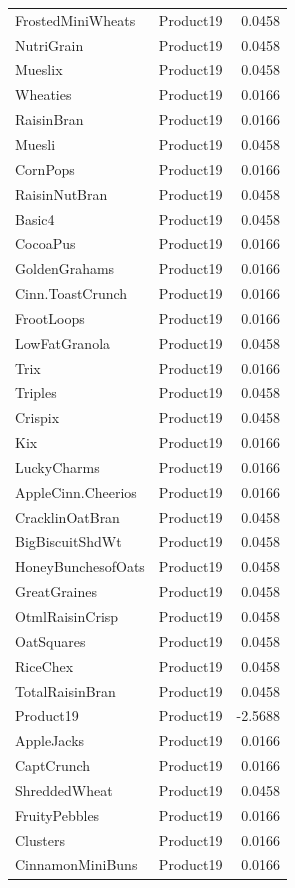 \begin{longtable}{llr}
FrostedMiniWheats & Product19 & 0.0458 \\
NutriGrain & Product19 & 0.0458 \\
Mueslix & Product19 & 0.0458 \\
Wheaties & Product19 & 0.0166 \\
RaisinBran & Product19 & 0.0166 \\
Muesli & Product19 & 0.0458 \\
CornPops & Product19 & 0.0166 \\
RaisinNutBran & Product19 & 0.0458 \\
Basic4 & Product19 & 0.0458 \\
CocoaPus & Product19 & 0.0166 \\
GoldenGrahams & Product19 & 0.0166 \\
Cinn.ToastCrunch & Product19 & 0.0166 \\
FrootLoops & Product19 & 0.0166 \\
LowFatGranola & Product19 & 0.0458 \\
Trix & Product19 & 0.0166 \\
Triples & Product19 & 0.0458 \\
Crispix & Product19 & 0.0458 \\
Kix & Product19 & 0.0166 \\
LuckyCharms & Product19 & 0.0166 \\
AppleCinn.Cheerios & Product19 & 0.0166 \\
CracklinOatBran & Product19 & 0.0458 \\
BigBiscuitShdWt & Product19 & 0.0458 \\
HoneyBunchesofOats & Product19 & 0.0458 \\
GreatGraines & Product19 & 0.0458 \\
OtmlRaisinCrisp & Product19 & 0.0458 \\
OatSquares & Product19 & 0.0458 \\
RiceChex & Product19 & 0.0458 \\
TotalRaisinBran & Product19 & 0.0458 \\
Product19 & Product19 & -2.5688 \\
AppleJacks & Product19 & 0.0166 \\
CaptCrunch & Product19 & 0.0166 \\
ShreddedWheat & Product19 & 0.0458 \\
FruityPebbles & Product19 & 0.0166 \\
Clusters & Product19 & 0.0166 \\
CinnamonMiniBuns & Product19 & 0.0166 \\

\end{longtable}
